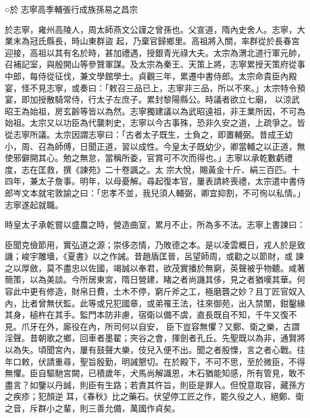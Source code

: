 
\begin{pinyinscope}

 ○於
 志寧高季輔張行成族孫易之昌宗



 於志寧，雍州高陵人，周太師燕文公謹之曾孫也。父宣道，隋內史舍人。志寧，大業末為冠氏縣長，時山東群盜
 起，乃棄官歸鄉里。高祖將入關，率群從於長春宮迎接，高祖以其有名於時，甚加禮遇，授銀青光祿大夫。太宗為渭北道行軍元帥，召補記室，與殷開山等參贊軍謀。及太宗為秦王、天策上將，志寧累授天策府從事中郎，每侍從征伐，兼文學館學士。貞觀三年，累遷中書侍郎。太宗命貴臣內殿宴，怪不見志寧，或奏曰：「敕召三品已上，志寧非三品，所以不來。」太宗特令預宴，即加授散騎常侍，行太子左庶子。累封黎陽縣公。時議者欲立七廟，
 以涼武昭王為始祖，房玄齡等皆以為然。志寧獨建議以為武昭遠祖，非王業所因，不可為始祖。太宗又以功臣為代襲刺史，志寧以今古事殊，恐非久安之道，上疏爭之。皆從志寧所議。太宗因謂志寧曰：「古者太子既生，士負之，即置輔弼。昔成王幼小，周、召為師傅，日聞正道，習以成性。今皇太子既幼少，卿當輔之以正道，無使邪僻開其心。勉之無怠，當稱所委，官賞可不次而得也。」志寧以承乾數虧禮度，志在匡救，撰《諫苑》二十卷諷之。太
 宗大悅，賜黃金十斤、絹三百匹。十四年，兼太子詹事。明年，以母憂解。尋起復本官，屢表請終喪禮，太宗遣中書侍郎岑文本就宅敦諭之曰：「忠孝不並，我兒須人輔弼，卿宜抑割，不可徇以私情。」志寧遂起就職。



 時皇太子承乾嘗以盛農之時，營造曲室，累月不止，所為多不法。志寧上書諫曰：



 臣聞克儉節用，實弘道之源；崇侈恣情，乃敗德之本。是以凌雲概日，戎人於是致譏；峻宇雕墻，《夏書》以之作誡。昔趙盾匡晉，呂望師周，或勸之以節財，或
 諫之以厚斂，莫不盡忠以佐國，竭誠以奉君，欲茂實播於無窮，英聲被乎物聽。咸著簡策，以為美談。今所居東宮，隋日營建，睹之者尚譏其侈，見之者猶嘆其華。何容此中更有修造，財帛日費，土木不停，窮斤斧之工，極磨礱之妙？且丁匠官奴入內，比者曾無伏監。此等或兄犯國章，或弟罹王法，往來御苑，出入禁闈，鉗鑿緣其身，槌杵在其手。監門本防非慮，宿衛以備不虞，直長既自不知，千牛又復不見。爪牙在外，廝役在內，所司何以自安，
 臣下豈容無懼？又鄭、衛之樂，古謂淫聲。昔朝歌之鄉，回車者墨翟；夾谷之會，揮劍者孔丘。先聖既以為非，通賢將以為失。頃聞宮內，屢有鼓聲大樂，伎兒入便不出。聞之者股慄，言之者心戰。往年口敕，伏請重尋，聖旨殷勤，明誡懇切。在於殿下，不可不思，至於微臣，不得無懼。臣自驅馳宮闕，已積歲年，犬馬尚解識恩，木石猶能知感，所有管見，敢不盡言？如鑒以丹誠，則臣有生路；若責其忤旨，則臣是罪人。但悅意取容，藏孫方之疾疹；犯顏逆
 耳，《春秋》比之藥石。伏望停工匠之作，罷久役之人，絕鄭、衛之音，斥群小之輩，則三善允備，萬國作貞矣。




\end{pinyinscope}
